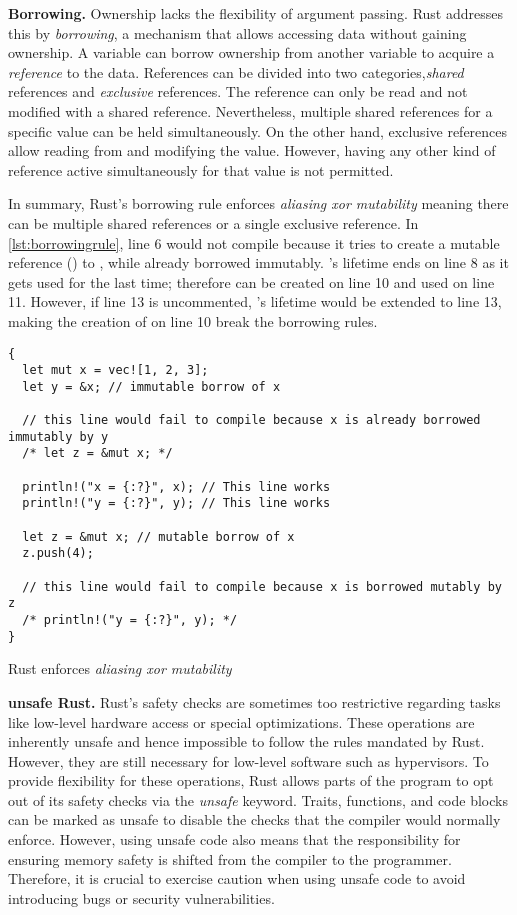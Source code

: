 \textbf{Borrowing.}
Ownership lacks the flexibility of argument passing.
Rust addresses this by \textit{borrowing},
a mechanism that allows accessing data without gaining ownership.
A variable can borrow ownership from another variable to acquire a
\textit{reference} to the data. References can be divided into two categories,\textit{shared}
references and \textit{exclusive} references. The reference can only be read
and not modified with a shared reference. Nevertheless, multiple shared
references for a specific value can be held simultaneously.
On the other hand, exclusive references allow reading from and modifying the
value. However, having any other kind of reference active simultaneously for
that value is not permitted.

In summary, Rust's borrowing rule enforces \textit{aliasing xor mutability}
meaning there can be multiple shared references or a single exclusive
reference.
In \autoref{lst:borrowingrule}, line 6 would not compile because it tries to create
a mutable reference () to , while  already borrowed
 immutably. 's lifetime ends on line 8 as it gets used for the
last time; therefore  can be created on line 10 and used on line 11.
However, if line 13 is uncommented, 's lifetime would be extended to
line 13, making the creation of  on line 10 break the borrowing rules.

\begin{listing}[hbtp]
    \begin{verbatim}
{
  let mut x = vec![1, 2, 3];
  let y = &x; // immutable borrow of x

  // this line would fail to compile because x is already borrowed immutably by y
  /* let z = &mut x; */

  println!("x = {:?}", x); // This line works
  println!("y = {:?}", y); // This line works

  let z = &mut x; // mutable borrow of x
  z.push(4);

  // this line would fail to compile because x is borrowed mutably by z
  /* println!("y = {:?}", y); */
}
    \end{verbatim}
    \caption{Rust enforces \textit{aliasing xor mutability}}
    \label{lst:borrowingrule}
    \vspace{-0.2cm}
\end{listing}

\textbf{unsafe Rust.}
Rust's safety checks are sometimes too restrictive regarding tasks like
low-level hardware access or special optimizations. These operations are
inherently unsafe and hence impossible to follow the rules mandated by Rust.
However, they are still necessary for low-level software such as
hypervisors. To provide flexibility for these operations, Rust allows
parts of the program to opt out of its safety checks via the \textit{unsafe}
keyword. Traits, functions, and code blocks can be marked as unsafe to disable
the checks that the compiler would normally enforce. However, using unsafe code
also means that the responsibility for ensuring memory safety is shifted from
the compiler to the programmer. Therefore, it is crucial to exercise
caution when using unsafe code to avoid introducing bugs or security
vulnerabilities.

